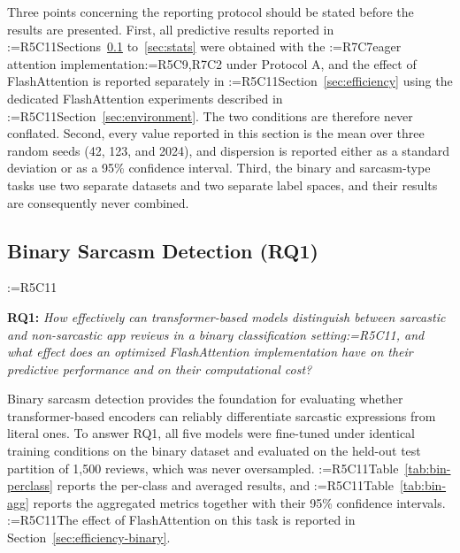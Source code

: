 \documentclass[a4paper,fleqn]{cas-sc}
\makeatletter
\newif\iftracked
\newcommand{\rv@setcolour}[1]{%
  \IfStrEq{#1}{R7C7}{\color{rvEdit}}{%
    \IfSubStr{#1}{R5}{\IfSubStr{#1}{R7}{\color{rvBoth}}{\color{rvFive}}}{\color{rvSeven}}}}
\newcommand{\rv@tag}[1]{\textsuperscript{\sffamily\bfseries\scriptsize[\StrSubstitute{#1}{,}{, }]}\,}
\newcommand{\rv@recordone}[1]{%
  \edef\rv@i{#1}%
  \ifcsdef{rv@n@\rv@i}{}{\csgdef{rv@n@\rv@i}{0}}%
  \csxdef{rv@n@\rv@i}{\the\numexpr\csuse{rv@n@\rv@i}+1\relax}%
  \begingroup\edef\@currentlabel{\rv@i}\label{rv:\rv@i:\csuse{rv@n@\rv@i}}\endgroup}
\newcommand{\rv@record}[1]{\@for\rv@id:=#1\do{\expandafter\rv@recordone\expandafter{\rv@id}}}
\DeclareRobustCommand{\rc}[2]{\rv@record{#1}\iftracked{\rv@setcolour{#1}\rv@tag{#1}#2}\else#2\fi}
\DeclareRobustCommand{\rcx}[2]{\iftracked{\rv@setcolour{#1}\rv@tag{#1}#2}\else#2\fi}
\DeclareRobustCommand{\rcmark}[1]{\rv@record{#1}}
\DeclareRobustCommand{\rcrep}[3]{\rv@record{#1}\iftracked{\rv@setcolour{#1}\rv@tag{#1}\rv@strike{#2} #3}\else#3\fi}
\makeatother
\begin{document}
Three points concerning the reporting protocol should be stated before the results are presented. First, all predictive results reported in \rcrep{R5C11}{Sections 6 and 6}{Sections~\ref{sec:rq1} to~\ref{sec:stats}} were obtained with the \rcrep{R7C7}{standard (eager)}{eager} attention implementation\rc{R5C9,R7C2}{ under Protocol A}, and the effect of FlashAttention is reported separately in \rcrep{R5C11}{Section 6.1}{Section~\ref{sec:efficiency}} using the dedicated FlashAttention experiments described in \rcrep{R5C11}{Section 5.2}{Section~\ref{sec:environment}}. The two conditions are therefore never conflated. Second, every value reported in this section is the mean over three random seeds (42, 123, and 2024), and dispersion is reported either as a standard deviation or as a 95\% confidence interval. Third, the binary and sarcasm-type tasks use two separate datasets and two separate label spaces, and their results are consequently never combined.

\subsection{\texorpdfstring{\rcx{R5C11}{Binary Sarcasm Detection (RQ1)}}{Binary Sarcasm Detection (RQ1)}}
\label{sec:rq1}
\rcmark{R5C11}
\begin{rqbox}
\textbf{RQ1:} \textit{How effectively can transformer-based models distinguish between sarcastic and non-sarcastic app reviews in a binary classification setting\rc{R5C11}{, and what effect does an optimized FlashAttention implementation have on their predictive performance and on their computational cost}?}
\end{rqbox}

Binary sarcasm detection provides the foundation for evaluating whether transformer-based encoders can reliably differentiate sarcastic expressions from literal ones. To answer RQ1, all five models were fine-tuned under identical training conditions on the binary dataset and evaluated on the held-out test partition of 1,500 reviews, which was never oversampled. \rcrep{R5C11}{Table 5}{Table~\ref{tab:bin-perclass}} reports the per-class and averaged results, and \rcrep{R5C11}{Table 6}{Table~\ref{tab:bin-agg}} reports the aggregated metrics together with their 95\% confidence intervals. \rc{R5C11}{The effect of FlashAttention on this task is reported in Section~\ref{sec:efficiency-binary}.}
\end{document}
